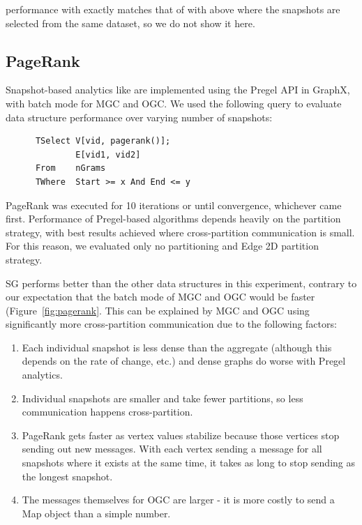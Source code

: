  performance with  exactly matches that of
 with  above where the snapshots are selected
from the same dataset, so we do not show it here.

\subsection{PageRank}

Snapshot-based analytics like  are implemented using
the Pregel API in GraphX, with batch mode for MGC and OGC.  We used
the following query to evaluate data structure performance over
varying number of snapshots:

\begin{small}
\begin{verbatim}
      TSelect V[vid, pagerank()];
              E[vid1, vid2]
      From    nGrams
      TWhere  Start >= x And End <= y
\end{verbatim}
\end{small}

PageRank was executed for 10 iterations or until convergence,
whichever came first.  Performance of Pregel-based algorithms depends
heavily on the partition strategy, with best results achieved where
cross-partition communication is small.  For this reason, we evaluated
only no partitioning and Edge 2D partition strategy.

SG performs better than the other data structures in this experiment,
contrary to our expectation that the batch mode of MGC and OGC would
be faster (Figure~\ref{fig:pagerank}.  This can be explained by MGC
and OGC using significantly more cross-partition communication due to
the following factors:

\begin{enumerate}[leftmargin=*]
\item Each individual snapshot is less dense than the aggregate
  (although this depends on the rate of change, etc.) and dense graphs
  do worse with Pregel analytics.
\item Individual snapshots are smaller and take fewer partitions, so
  less communication happens cross-partition.
\item PageRank gets faster as vertex values stabilize because those
  vertices stop sending out new messages. With each vertex sending a
  message for all snapshots where it exists at the same time, it takes
  as long to stop sending as the longest snapshot.  
\item The messages themselves for OGC are larger - it is more costly
  to send a Map object than a simple number.
\end{enumerate}

